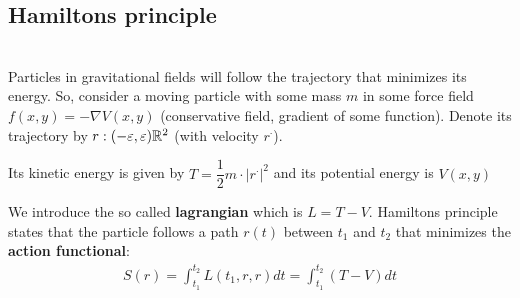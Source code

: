 \subsection{Hamiltons principle}\hfill\\
\noindent Particles in gravitational fields will follow the trajectory that minimizes its energy. So, consider a moving particle with some mass $m$ in some force field $f(x,y) = -\nabla V(x,y)$ (conservative field, gradient of some function). Denote its trajectory by $r:(-\varepsilon, \varepsilon)\mathbb{R}^2$ (with velocity $r^\cdot$).\par
\noindent Its kinetic energy is given by $T = \dfrac{1}{2}m·\left|r^\cdot\right|^2$ and its potential energy is $V(x,y)$
\par
\noindent We introduce the so called \textbf{lagrangian} which is $L = T-V$. Hamiltons principle states that the particle follows a path $r(t)$ between $t_1$ and $t_2$ that minimizes the \textbf{action functional}:
\begin{equation*}
  \begin{gathered}
    S(r) = \int_{t_1}^{t_2}L(t_1,r,r)dt = \int_{t_1}^{t_2}(T-V)dt
  \end{gathered}
\end{equation*}
